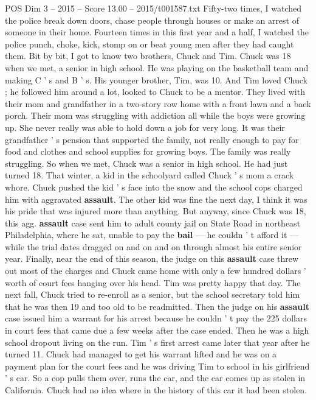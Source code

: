 \begin{textsample}{POS Dim 3 – 2015 – Score 13.00 – 2015/t001587.txt}
Fifty-two times, I watched the police break down doors, chase people through houses or make an arrest of someone in their home.
Fourteen times in this first year and a half, I watched the police punch, choke, kick, stomp on or beat young men after they had caught them.
Bit by bit, I got to know two brothers, Chuck and Tim.
Chuck was 18 when we met, a senior in high school.
He was playing on the basketball team and making C ' s and B ' s.
His younger brother, Tim, was 10.
And Tim loved Chuck ; he followed him around a lot, looked to Chuck to be a mentor.
They lived with their mom and grandfather in a two-story row home with a front lawn and a back porch.
Their mom was struggling with addiction all while the boys were growing up.
She never really was able to hold down a job for very long.
It was their grandfather ' s pension that supported the family, not really enough to pay for food and clothes and school supplies for growing boys.
The family was really struggling.
So when we met, Chuck was a senior in high school.
He had just turned 18.
That winter, a kid in the schoolyard called Chuck ' s mom a crack whore.
Chuck pushed the kid ' s face into the snow and the school cops charged him with aggravated \textbf{assault}.
The other kid was fine the next day, I think it was his pride that was injured more than anything.
But anyway, since Chuck was 18, this agg. \textbf{assault} case sent him to adult county jail on State Road in northeast Philadelphia, where he sat, unable to pay the \textbf{bail} — he couldn ' t afford it — while the trial dates dragged on and on and on through almost his entire senior year.
Finally, near the end of this season, the judge on this \textbf{assault} case threw out most of the charges and Chuck came home with only a few hundred dollars ' worth of court fees hanging over his head.
Tim was pretty happy that day.
The next fall, Chuck tried to re-enroll as a senior, but the school secretary told him that he was then 19 and too old to be readmitted.
Then the judge on his \textbf{assault} case issued him a warrant for his arrest because he couldn ' t pay the 225 dollars in court fees that came due a few weeks after the case ended.
Then he was a high school dropout living on the run.
Tim ' s first arrest came later that year after he turned 11.
Chuck had managed to get his warrant lifted and he was on a payment plan for the court fees and he was driving Tim to school in his girlfriend ' s car.
So a cop pulls them over, runs the car, and the car comes up as stolen in California.
Chuck had no idea where in the history of this car it had been stolen.

\end{textsample}
